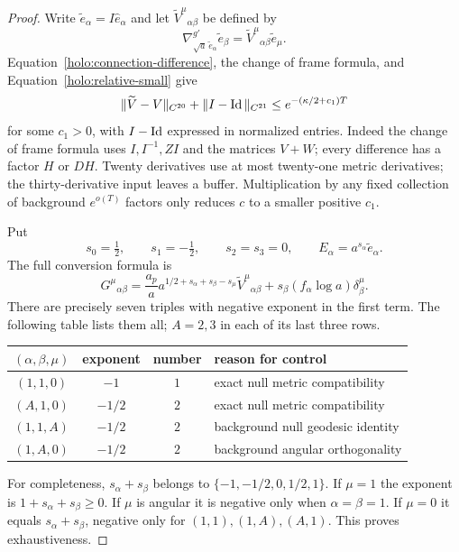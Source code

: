 \begin{proof}
Write $\widetilde e_\alpha=I\hat e_\alpha$ and let
$\widetilde V^\mu{}_{\alpha\beta}$ be defined by
\[
 \nabla^{g'}_{\sqrt a\,\widetilde e_\alpha}
                   \widetilde e_\beta
     =\widetilde V^\mu{}_{\alpha\beta}\widetilde e_\mu.
\]
Equation~\eqref{holo:connection-difference}, the change of frame
formula, and Equation~\eqref{holo:relative-small} give
\begin{equation}\label{holo:perturbed-connection-small}
 \|\widetilde V-V\|_{C^{20}}
       +\|I-\operatorname{Id}\|_{C^{21}}
       \leq e^{-(\kappa/2+c_1)T}
\end{equation}
for some $c_1>0$, with $I-\operatorname{Id}$ expressed in normalized entries.
Indeed the change of frame formula uses $I,I^{-1},Z I$ and the
matrices $V+W$; every difference has a factor $H$ or $DH$.
Twenty derivatives use at most twenty-one metric derivatives;
the thirty-derivative input leaves a buffer.  Multiplication by
any fixed collection of background $e^{o(T)}$ factors only reduces
$c$ to a smaller positive $c_1$.

Put
\[
 s_0=\tfrac12,\qquad s_1=-\tfrac12,\qquad s_2=s_3=0,
 \qquad E_\alpha=a^{s_\alpha}\widetilde e_\alpha.
\]
The full conversion formula is
\begin{equation}\label{holo:boost-conversion}
 G^\mu{}_{\alpha\beta}
   =\frac{a_p}{a}
      a^{1/2+s_\alpha+s_\beta-s_\mu}
                   \widetilde V^\mu{}_{\alpha\beta}
       +s_\beta(f_\alpha\log a)\delta^\mu_\beta.
\end{equation}
There are precisely seven triples with negative exponent in the
first term.  The following table lists them all; $A=2,3$ in each
of its last three rows.
\begin{center}
\begin{tabular}{c c c l}
$(\alpha,\beta,\mu)$ & exponent & number & reason for control\\
\hline
$(1,1,0)$ & $-1$ & $1$ & exact null metric compatibility\\
$(A,1,0)$ & $-1/2$ & $2$ & exact null metric compatibility\\
$(1,1,A)$ & $-1/2$ & $2$ & background null geodesic identity\\
$(1,A,0)$ & $-1/2$ & $2$ & background angular orthogonality
\end{tabular}
\end{center}
For completeness, $s_\alpha+s_\beta$ belongs to
$\{-1,-1/2,0,1/2,1\}$.  If $\mu=1$ the exponent is
$1+s_\alpha+s_\beta\geq0$.  If $\mu$ is angular it is negative
only when $\alpha=\beta=1$.  If $\mu=0$ it equals
$s_\alpha+s_\beta$, negative only for $(1,1),(1,A),(A,1)$.
This proves exhaustiveness.


\end{proof}
